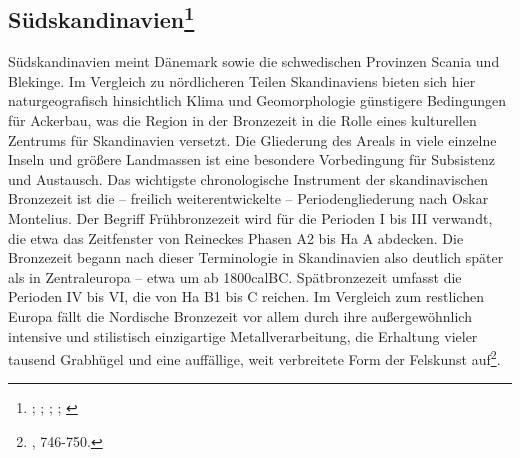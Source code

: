 \documentclass[openany,twoside,twocolumn]{book}
\let\rmarkdownfootnote\footnote%
\def\footnote{\protect\rmarkdownfootnote}
\begin{document}
\hypertarget{sudskandinavien}{%
\subsection[Südskandinavien]{\texorpdfstring{Südskandinavien\footnote{\textcite{ambrosiani_bronzezeit_1986}; \textcite{levy_heterarchy_1995}; \textcite{thrane_scandinavia_2013}; \textcite{victor_med_2002}; \textcite{wrigglesworth_bronze_2007}}}{Südskandinavien}}\label{sudskandinavien}}

Südskandinavien meint Dänemark sowie die schwedischen Provinzen Scania und Blekinge. Im Vergleich zu nördlicheren Teilen Skandinaviens bieten sich hier naturgeografisch hinsichtlich Klima und Geomorphologie günstigere Bedingungen für Ackerbau, was die Region in der Bronzezeit in die Rolle eines kulturellen Zentrums für Skandinavien versetzt. Die Gliederung des Areals in viele einzelne Inseln und größere Landmassen ist eine besondere Vorbedingung für Subsistenz und Austausch. Das wichtigste chronologische Instrument der skandinavischen Bronzezeit ist die -- freilich weiterentwickelte -- Periodengliederung nach Oskar Montelius. Der Begriff Frühbronzezeit wird für die Perioden I bis III verwandt, die etwa das Zeitfenster von Reineckes Phasen A2 bis Ha A abdecken. Die Bronzezeit begann nach dieser Terminologie in Skandinavien also deutlich später als in Zentraleuropa -- etwa um ab 1800calBC. Spätbronzezeit umfasst die Perioden IV bis VI, die von Ha B1 bis C reichen. Im Vergleich zum restlichen Europa fällt die Nordische Bronzezeit vor allem durch ihre außergewöhnlich intensive und stilistisch einzigartige Metallverarbeitung, die Erhaltung vieler tausend Grabhügel und eine auffällige, weit verbreitete Form der Felskunst auf\footnote{\textcite{thrane_scandinavia_2013}, 746-750.}.
\end{document}
